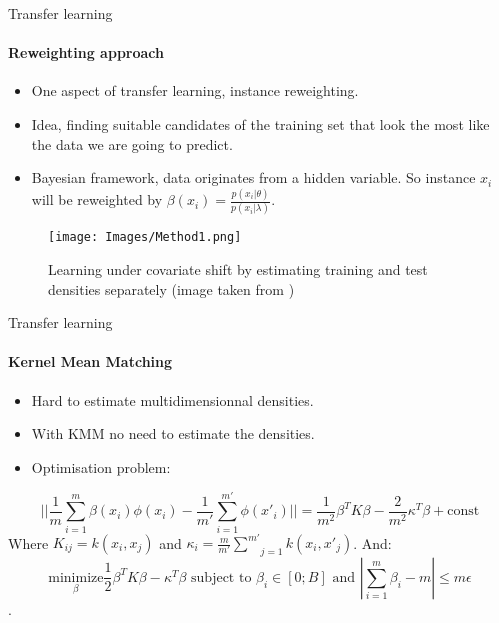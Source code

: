 \documentclass{beamer}
\begin{document}
\begin{frame}{Transfer learning}
\framesubtitle{Reweighting approach}

\begin{itemize}
\item One aspect of transfer learning, instance reweighting.
\item Idea, finding suitable candidates of the training set that look the most like the data we are going to predict.
\item Bayesian framework, data originates from a hidden variable. So instance $x_i$ will be reweighted by $\beta(x_i)=\frac{p(x_i|\theta)}{p(x_i|\lambda)}$.
\end{itemize}
\begin{figure}[!ht]
\centering
\texttt{[image: Images/Method1.png]}
\caption{Learning under covariate shift by estimating training
and test densities separately (image taken from \cite{pict})}
\label{fig: Method1}
\end{figure}


\end{frame}

\begin{frame}{Transfer learning}
\framesubtitle{Kernel Mean Matching}
\begin{itemize}
\item Hard to estimate multidimensionnal densities.
\item With KMM no need to estimate the densities.
\item Optimisation problem:
\end{itemize}
$$||\frac{1}{m}\underset{i=1}{\overset{m}{\sum}}\beta(x_i)\phi(x_i) - \frac{1}{m'}\underset{i=1}{\overset{m'}{\sum}}\phi(x'_i)|| = \frac{1}{m^2}\beta^T K \beta - \frac{2}{m^2} \kappa^T\beta + \text{const} $$
Where $K_{ij}=k(x_i,x_j)$ and $\kappa_i=\frac{m}{m'}\underset{j=1}{\overset{m'}{\sum}}k(x_i,x'_j)$. And: 
$$\underset{\beta}{\text{minimize}} \frac{1}{2}\beta^TK\beta-\kappa^T\beta \text{\ subject \ to } \beta_i \in [0;B] \text{\ and \ } |\underset{i=1}{\overset{m}{\sum}}\beta_i-m | \leq m\epsilon$$.

\end{frame}
\end{document}
